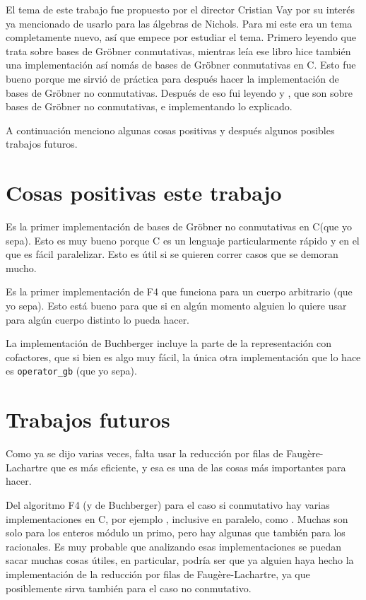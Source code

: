 \documentclass[12pt]{report}
\theoremstyle{customstyle}
\theoremstyle{factstyle}
\newcommand\cpp{C\nolinebreak[4]\hspace{-.05em}\raisebox{.4ex}{\relsize{-3}{\textbf{++}}}\xspace}
\begin{document}
El tema de este trabajo fue propuesto por el director Cristian Vay por su interés ya mencionado de usarlo para las álgebras de Nichols. Para mi este era un tema completamente nuevo, así que empece por estudiar el tema. Primero leyendo \cite{book:ideals-varieties-algorithms} que trata sobre bases de Gröbner conmutativas, mientras leía ese libro hice también una implementación así nomás de bases de Gröbner conmutativas en \cpp. Esto fue bueno porque me sirvió de práctica para después hacer la implementación de bases de Gröbner no conmutativas. Después de eso fui leyendo \cite{thesis:Hof20} y \cite{phdthesis:Hof23}, que son sobre bases de Gröbner no conmutativas, e implementando lo explicado.

A continuación menciono algunas cosas positivas y después algunos posibles trabajos futuros.

\section{Cosas positivas este trabajo}

Es la primer implementación de bases de Gröbner no conmutativas en \cpp (que yo sepa). Esto es muy bueno porque \cpp es un lenguaje particularmente rápido y en el que es fácil paralelizar. Esto es útil si se quieren correr casos que se demoran mucho.

Es la primer implementación de F4 que funciona para un cuerpo arbitrario (que yo sepa). Esto está bueno para que si en algún momento alguien lo quiere usar para algún cuerpo distinto lo pueda hacer.

La implementación de Buchberger incluye la parte de la representación con cofactores, que si bien es algo muy fácil, la única otra implementación que lo hace es \texttt{operator\_gb} (que yo sepa).

\section{Trabajos futuros}\label{section:trabajos futuros}

Como ya se dijo varias veces, falta usar la reducción por filas de Faugère-Lachartre que es más eficiente, y esa es una de las cosas más importantes para hacer.

Del algoritmo F4 (y de Buchberger) para el caso si conmutativo hay varias implementaciones en \cpp, por ejemplo \cite{lib:openf4, lib:mathic, lib:M4GB}, inclusive en paralelo, como \cite{DBLP:journals/jsc/Reeves98, lib:parallelGBC}. Muchas son solo para los enteros módulo un primo, pero hay algunas que también para los racionales. Es muy probable que analizando esas implementaciones se puedan sacar muchas cosas útiles, en particular, podría ser que ya alguien haya hecho la implementación de la reducción por filas de Faugère-Lachartre, ya que posiblemente sirva también para el caso no conmutativo.
\end{document}
